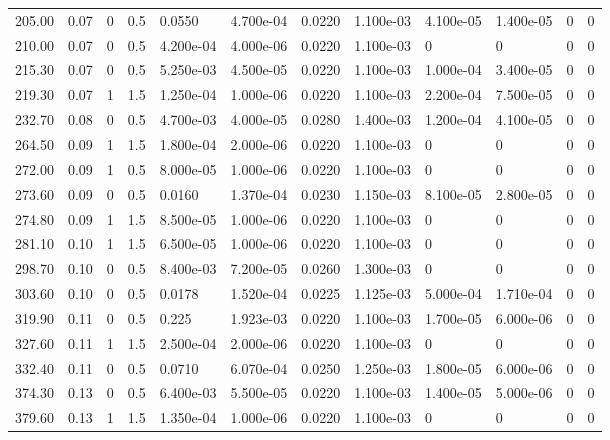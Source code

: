 \documentclass[preview]{standalone}
\begin{document}
{{\begin{tabular}{L{1.2cm}C{1.2cm} C{0.3cm}C{0.5cm} C{1.4cm}C{1.4cm} C{1.4cm}C{1.4cm} C{1.6cm}C{1.6cm} C{1.6cm}C{1.6cm}}
  205.00  &  0.07  & 0     & 0.5 &  0.0550  & 4.700e-04  &  0.0220&   1.100e-03& 4.100e-05 & 1.400e-05   &  0 & 0  \\ 
  210.00  &  0.07  & 0     & 0.5 &  4.200e-04  & 4.000e-06  &  0.0220&   1.100e-03& 0 & 0   &  0 & 0  \\ 
  215.30  &  0.07  & 0     & 0.5 &  5.250e-03  & 4.500e-05  &  0.0220&   1.100e-03& 1.000e-04 & 3.400e-05   &  0 & 0  \\ 
  219.30  &  0.07  & 1     & 1.5 &  1.250e-04  & 1.000e-06  &  0.0220&   1.100e-03& 2.200e-04 & 7.500e-05   &  0 & 0  \\ 
  232.70  &  0.08  & 0     & 0.5 &  4.700e-03  & 4.000e-05  &  0.0280&   1.400e-03& 1.200e-04 & 4.100e-05   &  0 & 0  \\ 
  264.50  &  0.09  & 1     & 1.5 &  1.800e-04  & 2.000e-06  &  0.0220&   1.100e-03& 0 & 0   &  0 & 0  \\ 
  272.00  &  0.09  & 1     & 0.5 &  8.000e-05  & 1.000e-06  &  0.0220&   1.100e-03& 0 & 0   &  0 & 0  \\ 
  273.60  &  0.09  & 0     & 0.5 &  0.0160  & 1.370e-04  &  0.0230&   1.150e-03& 8.100e-05 & 2.800e-05   &  0 & 0  \\ 
  274.80  &  0.09  & 1     & 1.5 &  8.500e-05  & 1.000e-06  &  0.0220&   1.100e-03& 0 & 0   &  0 & 0  \\ 
  281.10  &  0.10  & 1     & 1.5 &  6.500e-05  & 1.000e-06  &  0.0220&   1.100e-03& 0 & 0   &  0 & 0  \\ 
  298.70  &  0.10  & 0     & 0.5 &  8.400e-03  & 7.200e-05  &  0.0260&   1.300e-03& 0 & 0   &  0 & 0  \\ 
  303.60  &  0.10  & 0     & 0.5 &  0.0178  & 1.520e-04  &  0.0225&   1.125e-03& 5.000e-04 & 1.710e-04   &  0 & 0  \\ 
  319.90  &  0.11  & 0     & 0.5 &  0.225  & 1.923e-03  &  0.0220&   1.100e-03& 1.700e-05 & 6.000e-06   &  0 & 0  \\ 
  327.60  &  0.11  & 1     & 1.5 &  2.500e-04  & 2.000e-06  &  0.0220&   1.100e-03& 0 & 0   &  0 & 0  \\ 
  332.40  &  0.11  & 0     & 0.5 &  0.0710  & 6.070e-04  &  0.0250&   1.250e-03& 1.800e-05 & 6.000e-06   &  0 & 0  \\ 
  374.30  &  0.13  & 0     & 0.5 &  6.400e-03  & 5.500e-05  &  0.0220&   1.100e-03& 1.400e-05 & 5.000e-06   &  0 & 0  \\ 
  379.60  &  0.13  & 1     & 1.5 &  1.350e-04  & 1.000e-06  &  0.0220&   1.100e-03& 0 & 0   &  0 & 0  \\ 

\end{tabular}}}
\end{document}
